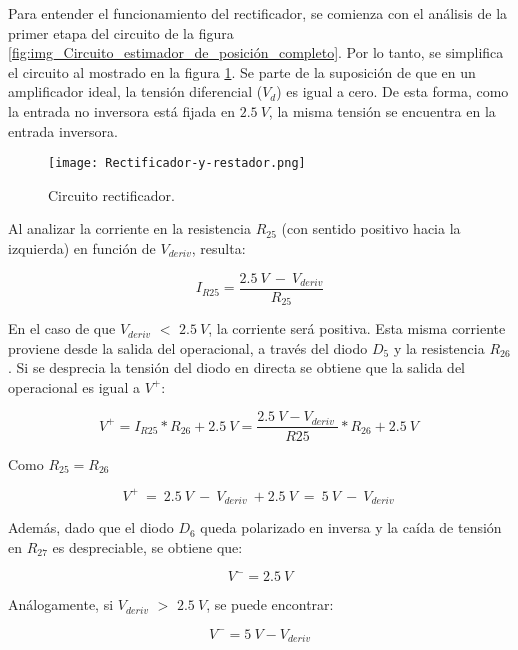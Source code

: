 Para entender el funcionamiento del rectificador, se comienza con el análisis de la primer etapa del circuito de la figura \ref{fig:img_Circuito_estimador_de_posición_completo}. Por lo tanto, se simplifica el circuito al mostrado en la figura \ref{fig:img_Rectificador_y_restador}. Se parte de la suposición de que en un amplificador ideal, la tensión diferencial ($V_d$) es igual a cero. De esta forma, como la entrada no inversora está fijada en $2.5\:V$, la misma tensión se encuentra en la entrada inversora.


\begin{figure}[H]
	\centering
	\texttt{[image: Rectificador-y-restador.png]}
	\caption{Circuito rectificador.}
	\label{fig:img_Rectificador_y_restador}
\end{figure}

Al analizar la corriente en la resistencia $R_{25}$ (con sentido positivo hacia la izquierda) en función de $V_{deriv}$, resulta:

\begin{equation} \label{eq_corriente_r25}
	I_{R25}=\frac{2.5\:V\ -\ V_{deriv}}{R_{25}}
\end{equation}

En el caso de que $V_{deriv}$ $\mathrm{<}$ $2.5\:V$, la corriente será positiva. Esta misma corriente proviene desde la salida del operacional, a través del diodo $D_5$ y la resistencia $R_{26}$. Si se desprecia la tensión del diodo en directa se obtiene que la salida del operacional es igual a $V^+$:

\begin{equation} \label{eq_V+}
	V^+=I_{R25}*R_{26}+2.5\:V=\frac{2.5\:V-V_{deriv}\ }{R25}*R_{26}+2.5\:V\ 
\end{equation} 

Como $R_{25}=R_{26}$

\begin{equation} \label{eq_V+_2}
	V^+\ =\ 2.5\:V\ -\ V_{deriv}\ +2.5\:V\ =\ 5\:V\ -\ V_{deriv}\ 
\end{equation}

Además, dado que el diodo $D_6$ queda polarizado en inversa y la caída de tensión en $R_{27}$ es despreciable, se obtiene que:
 
 \begin{equation} 
 	V^- = 2.5\:V 
 \end{equation}

Análogamente, si $V_{deriv}$ $\mathrm{>}$ $2.5\:V$, se puede encontrar:

\begin{equation} \label{eq_V+_3}
	V^- =5\:V-V_{deriv} 
\end{equation}

